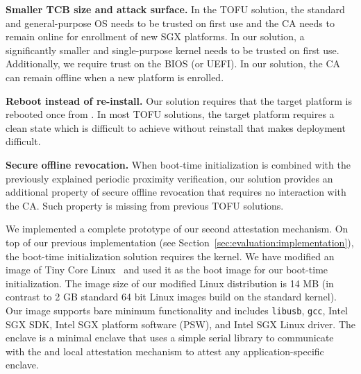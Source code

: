 \begin{mylist}
\item \textbf{Smaller TCB size and attack surface.} 
In the TOFU solution, the standard and general-purpose OS needs to be trusted on first use and the CA needs to remain online for enrollment of new SGX platforms. In our solution, a significantly smaller and single-purpose kernel needs to be trusted on first use. Additionally, we require trust on the BIOS (or UEFI). In our solution, the CA can remain offline when a new platform is enrolled.


\item \textbf{Reboot instead of re-install.} Our solution requires that the target platform is rebooted once from \device. In most TOFU solutions, the target platform requires a clean state which is difficult to achieve without reinstall that makes deployment difficult.


\item \textbf{Secure offline revocation.} When boot-time initialization is combined with the previously explained periodic proximity verification, our solution provides an additional property of secure offline revocation that requires no interaction with the CA. Such property is missing from previous TOFU solutions.

\end{mylist}

\parasaver
{} We implemented a complete prototype of our second attestation mechanism. On top of our previous \name implementation (see Section~\ref{sec:evaluation:implementation}), the boot-time initialization solution requires the \name kernel. We have modified an image of Tiny Core Linux~\cite{tinyCore} and used it as the boot image for our boot-time initialization. The image size of our modified Linux distribution is 14 MB (in contrast to 2 GB standard 64 bit Linux images build on the standard kernel). Our image supports bare minimum functionality and includes \texttt{libusb}, \texttt{gcc}, Intel SGX SDK, Intel SGX platform software (PSW), and Intel SGX Linux driver. The \name enclave is a minimal enclave that uses a simple serial library to communicate with the \device and local attestation mechanism to attest any application-specific enclave.

